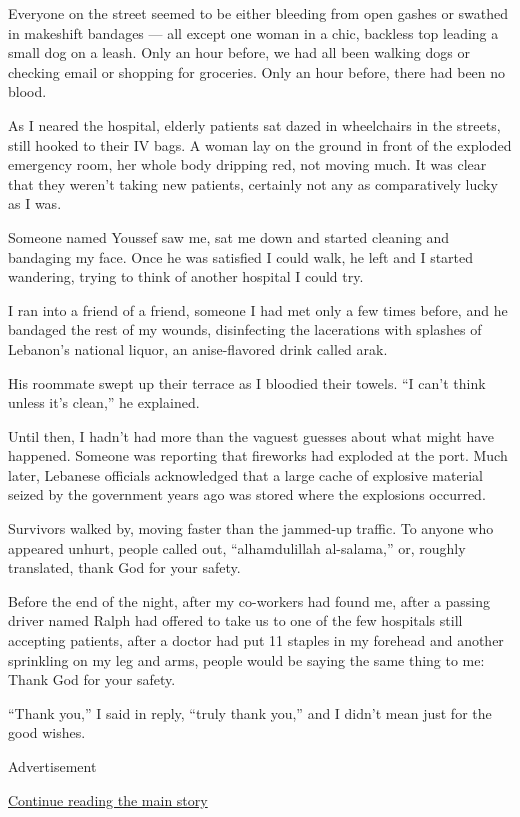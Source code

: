 Everyone on the street seemed to be either bleeding from open gashes or
swathed in makeshift bandages --- all except one woman in a chic,
backless top leading a small dog on a leash. Only an hour before, we had
all been walking dogs or checking email or shopping for groceries. Only
an hour before, there had been no blood.

As I neared the hospital, elderly patients sat dazed in wheelchairs in
the streets, still hooked to their IV bags. A woman lay on the ground in
front of the exploded emergency room, her whole body dripping red, not
moving much. It was clear that they weren't taking new patients,
certainly not any as comparatively lucky as I was.

Someone named Youssef saw me, sat me down and started cleaning and
bandaging my face. Once he was satisfied I could walk, he left and I
started wandering, trying to think of another hospital I could try.

I ran into a friend of a friend, someone I had met only a few times
before, and he bandaged the rest of my wounds, disinfecting the
lacerations with splashes of Lebanon's national liquor, an
anise-flavored drink called arak.

His roommate swept up their terrace as I bloodied their towels. ``I
can't think unless it's clean,'' he explained.

Until then, I hadn't had more than the vaguest guesses about what might
have happened. Someone was reporting that fireworks had exploded at the
port. Much later, Lebanese officials acknowledged that a large cache of
explosive material seized by the government years ago was stored where
the explosions occurred.

Survivors walked by, moving faster than the jammed-up traffic. To anyone
who appeared unhurt, people called out, ``alhamdulillah al-salama,'' or,
roughly translated, thank God for your safety.

Before the end of the night, after my co-workers had found me, after a
passing driver named Ralph had offered to take us to one of the few
hospitals still accepting patients, after a doctor had put 11 staples in
my forehead and another sprinkling on my leg and arms, people would be
saying the same thing to me: Thank God for your safety.

``Thank you,'' I said in reply, ``truly thank you,'' and I didn't mean
just for the good wishes.

Advertisement

\protect\hyperlink{after-bottom}{Continue reading the main story}

